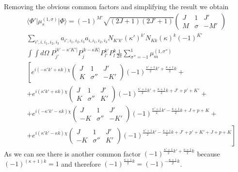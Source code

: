 Removing the obvious common factors and simplifying the result we obtain
\begin{eqnarray}  \nonumber &&
\langle \Phi' \vert \mu^{(1,\sigma)}_s \vert \Phi \rangle = 
(-1)^{M'} \sqrt{(2 J+1)(2 J'+1)} 
\left( \begin{array}{ccc} 
 J &      1 &  J' \\
 M & \sigma & -M'  \end{array} \right)
\\ \nonumber &&
\sum_{i',i,i_1,i_2,i_3} a_{i',i_1,i_2,i_3} a_{i,i_1,i_2,i_3} N_{K'k'} (\kappa')^{k'} N_{Kk} (\kappa)^{k} (-1)^{K'}
\\ \nonumber &&
\int \int d\Omega \; P^{\vert k' - \kappa' K' \vert}_{j'} P^{\vert k - \kappa K \vert}_{j} 
P^{k'}_{l'}  P^{k}_{l} \frac{1}{2 \pi}
\sum^{1}_{\sigma'' = -1} \mu^{(1,\sigma'')}_m 
\\ \nonumber &&
\left[ 
e^{i(- \kappa' k'+ \kappa k) \chi  }
\left( \begin{array}{ccc} 
 J &        1 &  J' \\
 K & \sigma'' & -K'  \end{array} \right) (-1)^{ \frac{\kappa' +1}{2} k' + \frac{\kappa +1}{2} k } \right. +
\\ \nonumber &&
+ e^{i( \kappa' k'+ \kappa k) \chi  }
\left( \begin{array}{ccc} 
 J &        1 &  J' \\
 K & \sigma'' &  K'  \end{array} \right) (-1)^{\frac{\kappa' +1}{2} k' + \frac{\kappa +1}{2} k + J'+p'+K'} +
\\ \nonumber &&
+ e^{i(- \kappa' k' - \kappa k) \chi  }
\left( \begin{array}{ccc} 
 J &        1 &  J' \\
-K & \sigma'' & -K'  \end{array} \right) (-1)^{\frac{\kappa' +1}{2} k' - \frac{\kappa +1}{2} k + J+p+K} +
\\           &&
\left. + e^{i( \kappa' k' - \kappa k) \chi  }
\left( \begin{array}{ccc} 
 J &        1 &  J' \\
-K & \sigma'' &  K'  \end{array} \right) (-1)^{\frac{\kappa' +1}{2} k' - \frac{\kappa +1}{2} k + J'+p'+K' + J+p+K} \right]
\end{eqnarray}
As we can see there is another common factor $(-1)^{\frac{\kappa' +1}{2} k' + \frac{ \kappa +1}{2} k}$ because
$(-1)^{(\kappa +1) k} = 1$ and therefore $(-1)^{\frac{\kappa +1}{2} k} = (-1)^{-\frac{\kappa +1}{2} k}$.


